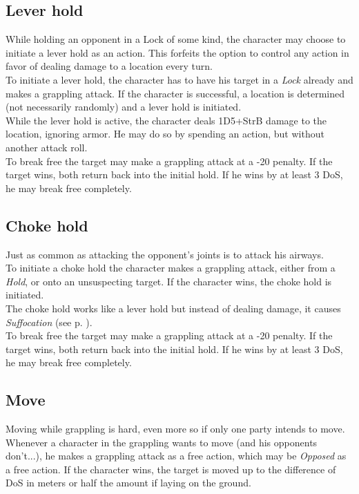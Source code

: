 \subsection*{Lever hold}
While holding an opponent in a Lock of some kind, the character may choose to initiate a lever hold as an action.
This forfeits the option to control any action in favor of dealing damage to a location every turn.
\\%
To initiate a lever hold,
	the character has to have his target in a \emph{Lock} already
	and makes a grappling attack.
If the character is successful,
	a location is determined (not necessarily randomly)
	and a lever hold is initiated.
\\%
While the lever hold is active,
	the character deals 1D5+StrB damage to the location,
	ignoring armor.
He may do so by spending an action,
	but without another attack roll.
\\%
To break free the target may make a grappling attack at a -20  penalty.
If the target wins, both return back into the initial hold.
If he wins by at least 3 DoS, he may break free completely.
\subsection*{Choke hold}
Just as common as attacking the opponent's joints is to attack his airways.\\
To initiate a choke hold the character makes a grappling attack,
	either from a \emph{Hold},
	or onto an unsuspecting target.
If the character wins, the choke hold is initiated.\\
The choke hold works like a lever hold but instead of dealing damage, it causes \emph{Suffocation} (see p. \pageref{hazards:suffocation}).\\
To break free the target may make a grappling attack at a -20  penalty.
If the target wins, both return back into the initial hold.
If he wins by at least 3 DoS, he may break free completely.
\subsection*{Move}
Moving while grappling is hard, even more so if only one party intends to move.\\
Whenever a character in the grappling wants to move
	(and his opponents don't...),
	he makes a grappling attack as a free action,
	which may be \emph{Opposed} as a free action.
If the character wins, the target is moved up to the difference of DoS in meters
	or half the amount if laying on the ground.

